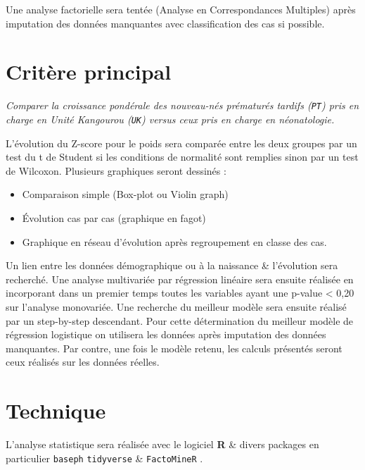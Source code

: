\documentclass[
  a4paperpaper,
  french]{scrartcl}
\providecommand{\tightlist}{%
  \setlength{\itemsep}{0pt}\setlength{\parskip}{0pt}}\usepackage{longtable,booktabs,array}
\begin{document}
Une analyse factorielle sera tentée (Analyse en Correspondances
Multiples) après imputation des données manquantes avec classification
des cas si possible.

\hypertarget{crituxe8re-principal}{%
\section{Critère principal}\label{crituxe8re-principal}}

\emph{Comparer la croissance pondérale des nouveau-nés prématurés
tardifs (\texttt{PT}) pris en charge en Unité Kangourou (\texttt{UK})
versus ceux pris en charge en néonatologie.}

L'évolution du Z-score pour le poids sera comparée entre les deux
groupes par un test du t de Student si les conditions de normalité sont
remplies sinon par un test de Wilcoxon. Plusieurs graphiques seront
dessinés :

\begin{itemize}
\tightlist
\item
  Comparaison simple (Box-plot ou Violin graph)
\item
  Évolution cas par cas (graphique en fagot)
\item
  Graphique en réseau d'évolution après regroupement en classe des cas.
\end{itemize}

Un lien entre les données démographique ou à la naissance \& l'évolution
sera recherché. Une analyse multivariée par régression linéaire sera
ensuite réalisée en incorporant dans un premier temps toutes les
variables ayant une p-value \textless{} 0,20 sur l'analyse monovariée.
Une recherche du meilleur modèle sera ensuite réalisé par un
step-by-step descendant. Pour cette détermination du meilleur modèle de
régression logistique on utilisera les données après imputation des
données manquantes. Par contre, une fois le modèle retenu, les calculs
présentés seront ceux réalisés sur les données réelles.

\hypertarget{technique}{%
\section{Technique}\label{technique}}

L'analyse statistique sera réalisée avec le logiciel
\textbf{R}\citep{rstat} \& divers packages en particulier
\texttt{baseph} \citep{baseph} \texttt{tidyverse} \citep{tidy} \&
\texttt{FactoMineR} \citep{facto}.


  
\end{document}
